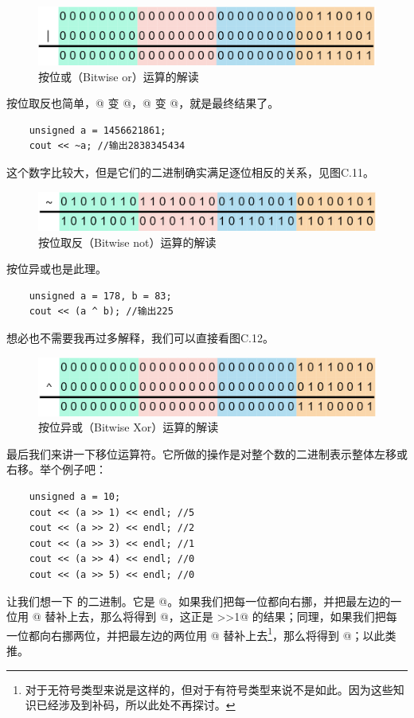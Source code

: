 \begin{figure}[htbp]
    \centering
    \includegraphics[width=.8\textwidth]{../images/other_parts/C_bitwise_or.drawio.png}
    \caption{按位或（Bitwise or）运算的解读}
\end{figure}\par
按位取反也简单，@ 变 @，@ 变 @，就是最终结果了。
\begin{lstlisting}
    unsigned a = 1456621861;
    cout << ~a; //输出2838345434
\end{lstlisting}
这个数字比较大，但是它们的二进制确实满足逐位相反的关系，见图C.11。\par
\begin{figure}[htbp]
    \centering
    \includegraphics[width=.8\textwidth]{../images/other_parts/C_bitwise_not.drawio.png}
    \caption{按位取反（Bitwise not）运算的解读}
\end{figure}
按位异或也是此理。
\begin{lstlisting}
    unsigned a = 178, b = 83;
    cout << (a ^ b); //输出225
\end{lstlisting}
想必也不需要我再过多解释，我们可以直接看图C.12。\par
\begin{figure}[htbp]
    \centering
    \includegraphics[width=.8\textwidth]{../images/other_parts/C_bitwise_xor.drawio.png}
    \caption{按位异或（Bitwise Xor）运算的解读}
\end{figure}
最后我们来讲一下移位运算符。它所做的操作是对整个数的二进制表示整体左移或右移。举个例子吧：
\begin{lstlisting}
    unsigned a = 10;
    cout << (a >> 1) << endl; //5
    cout << (a >> 2) << endl; //2
    cout << (a >> 3) << endl; //1
    cout << (a >> 4) << endl; //0
    cout << (a >> 5) << endl; //0
\end{lstlisting}
让我们想一下 \lstinline@a@ 的二进制。它是 @。如果我们把每一位都向右挪，并把最左边的一位用 @ 替补上去，那么将得到 @，这正是 \lstinline@a>>1@ 的结果；同理，如果我们把每一位都向右挪两位，并把最左边的两位用 @ 替补上去\footnote{对于无符号类型来说是这样的，但对于有符号类型来说不是如此。因为这些知识已经涉及到补码，所以此处不再探讨。}，那么将得到 @；以此类推。\par
